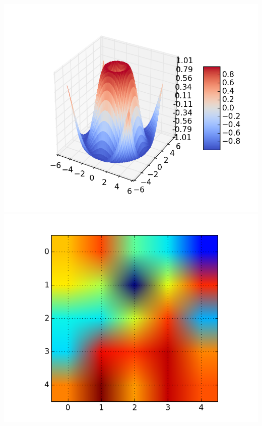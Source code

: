 \documentclass[10pt,dvipdfmx]{beamer}
\begin{document}
\begin{frame}
\begin{columns}
\begin{column}{0.4\textwidth}
\begin{center}
    \begin{minipage}[t]{0.3\textwidth}
      \vskip-2cm
      \includegraphics[width=\textwidth]{out/pdf/img/surface3d_demo_hires.pdf} \\
      \includegraphics[width=\textwidth]{out/pdf/img/image_interp_00_hires.pdf}
    \end{minipage}
    \begin{minipage}[t]{0.5\textwidth}

\end{minipage}
\end{center}
\end{column}
\end{columns}
\end{frame}
\end{document}
